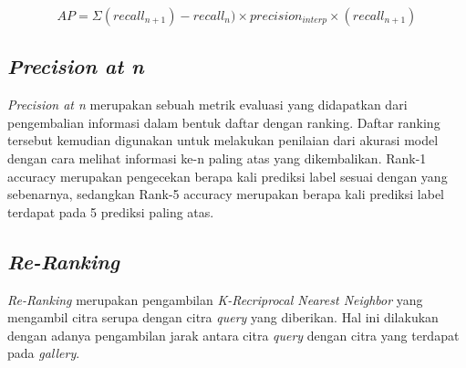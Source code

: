 \[AP = \Sigma (recall_{n+1})-recall_n)\times precision_{interp}\times(recall_{n+1})\]

\subsection{\textit{Precision at n}}
\vspace{1ex}
\textit{Precision at n} merupakan sebuah metrik evaluasi yang didapatkan dari pengembalian informasi dalam bentuk daftar dengan ranking. Daftar ranking tersebut kemudian digunakan untuk melakukan penilaian dari akurasi model dengan cara melihat informasi ke-n paling atas yang dikembalikan. Rank-1 accuracy merupakan pengecekan berapa kali prediksi label sesuai dengan yang sebenarnya, sedangkan Rank-5 accuracy merupakan berapa kali prediksi label terdapat pada 5 prediksi paling atas.

\subsection{\textit{Re-Ranking}}
\vspace{1ex}
\textit{Re-Ranking} merupakan pengambilan \textit{K-Recriprocal Nearest Neighbor} yang mengambil citra serupa dengan citra \textit{query} yang diberikan. Hal ini dilakukan dengan adanya pengambilan jarak antara citra \textit{query} dengan citra yang terdapat pada \textit{gallery}.